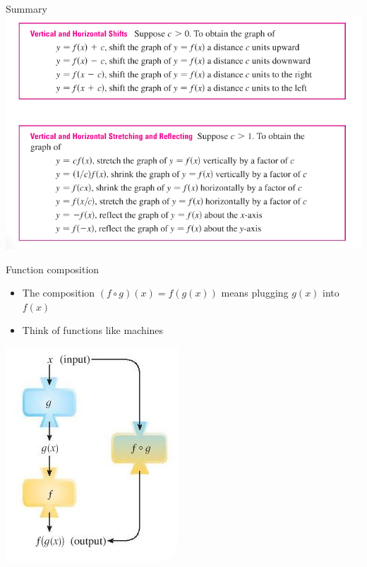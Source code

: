 \documentclass[t,handout]{beamer}
\begin{document}
\begin{frame}{Summary}
\vfill
\includegraphics[width=\textwidth,height=\textheight,keepaspectratio]{shifts}
\vfill
\end{frame}

\begin{frame}{Function composition}
\begin{itemize}
\item The composition $(f \circ g)(x)= f(g(x))$ means plugging $g(x)$ into $f(x)$
\item Think of functions like machines
\end{itemize}
\vfill
\includegraphics[width=\textwidth,height=0.5\textheight,keepaspectratio]{machines}
\vfill
\end{frame}
\end{document}
